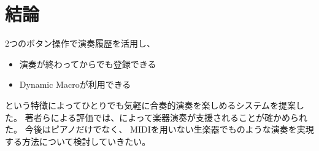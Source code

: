 \section{結論}


2つのボタン操作で演奏履歴を活用し、
\begin{itemize}
\item 演奏が終わってからでも登録できる
\item Dynamic Macroが利用できる
\end{itemize}
という特徴によってひとりでも気軽に合奏的演奏を楽しめるシステム{\system}を提案した。
著者らによる評価では、{\system}によって楽器演奏が支援されることが確かめられた。
今後はピアノだけでなく、
MIDIを用いない生楽器でも{\system}のような演奏を実現する方法について検討していきたい。

